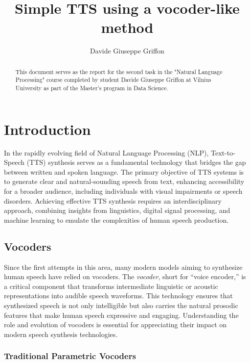 \documentclass[12pt]{article}
\title{Simple TTS using a vocoder-like method}
\author{Davide Giuseppe Griffon}
\date{}
\begin{document}
\maketitle

\begin{abstract}
    This document serves as the report for the second task in the "Natural Language Processing" course completed by student Davide Giuseppe Griffon at Vilnius University as part of the Master's program in Data Science.
\end{abstract}

\tableofcontents

\newpage

\section{Introduction}

In the rapidly evolving field of Natural Language Processing (NLP), Text-to-Speech (TTS) synthesis serves as a fundamental technology that bridges the gap between written and spoken language. The primary objective of TTS systems is to generate clear and natural-sounding speech from text, enhancing accessibility for a broader audience, including individuals with visual impairments or speech disorders. Achieving effective TTS synthesis requires an interdisciplinary approach, combining insights from linguistics, digital signal processing, and machine learning to emulate the complexities of human speech production.

\subsection{Vocoders}
Since the first attempts in this area, many modern models aiming to synthesize human speech have relied on vocoders. The \textit{vocoder}, short for ``voice encoder,'' is a critical component that transforms intermediate linguistic or acoustic representations into audible speech waveforms. This technology ensures that synthesized speech is not only intelligible but also carries the natural prosodic features that make human speech expressive and engaging. Understanding the role and evolution of vocoders is essential for appreciating their impact on modern speech synthesis technologies.

\subsubsection{Traditional Parametric Vocoders}
\end{document}
